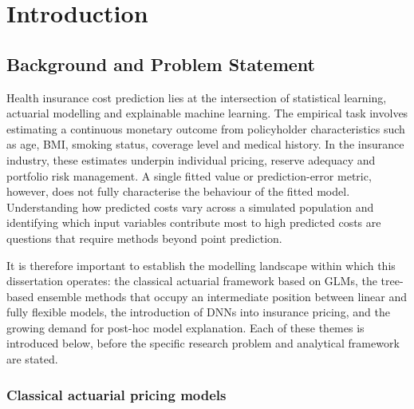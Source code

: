 \section{Introduction}
\label{sec:introduction}


\subsection{Background and Problem Statement}
\label{sec:background_problem_statement}

Health insurance cost prediction lies at the intersection of statistical
learning, actuarial modelling and explainable machine learning.  The
empirical task involves estimating a continuous monetary outcome from
policyholder characteristics such as age, BMI, smoking
status, coverage level and medical history.  In the insurance industry,
these estimates underpin individual pricing, reserve adequacy and
portfolio risk management.  A single fitted value or prediction-error
metric, however, does not fully characterise the behaviour of the fitted
model.  Understanding how predicted costs vary across a simulated
population and identifying which input variables contribute most to high
predicted costs are questions that require methods beyond point
prediction.

It is therefore important to establish the modelling landscape within
which this dissertation operates: the classical actuarial framework
based on GLMs, the tree-based ensemble methods that
occupy an intermediate position between linear and fully flexible models,
the introduction of DNNs into insurance pricing, and the
growing demand for post-hoc model explanation.  Each of these themes is
introduced below, before the specific research problem and analytical
framework are stated.

\subsubsection{Classical actuarial pricing models}
\label{sec:classical_actuarial}

